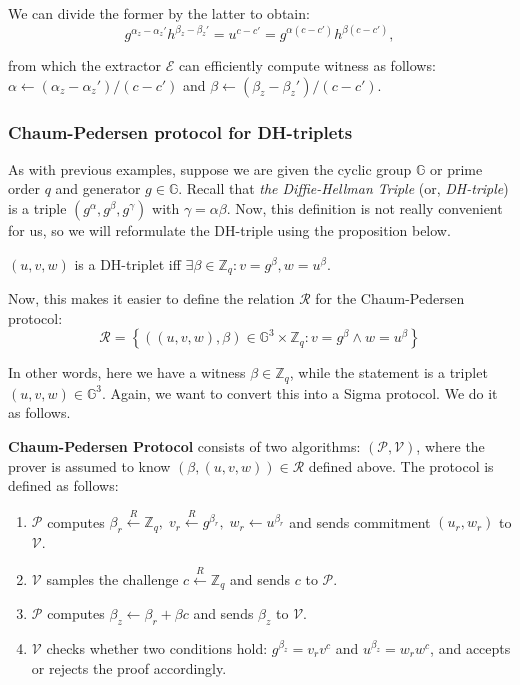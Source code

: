 \documentclass[../lecture-notes-148x210.tex]{subfiles}
\begin{document}
We can divide the former by the latter to obtain:
\begin{equation*}
    g^{\alpha_z - \alpha_z'}h^{\beta_z - \beta_z'} = u^{c-c'} = g^{\alpha(c-c')}h^{\beta(c-c')},
\end{equation*}

from which the extractor $\mathcal{E}$ can efficiently compute witness as follows: $\alpha \gets (\alpha_z - \alpha_z')\big/(c-c')$ and $\beta \gets (\beta_z - \beta_z')\big/(c-c')$.

\subsubsection{Chaum-Pedersen protocol for DH-triplets}

As with previous examples, suppose we are given the cyclic group $\mathbb{G}$ or prime order $q$ and generator $g \in \mathbb{G}$. Recall that \textit{the Diffie-Hellman Triple} (or, \textit{DH-triple}) is a triple $(g^{\alpha},g^{\beta},g^{\gamma})$ with $\gamma=\alpha\beta$. Now, this definition is not really convenient for us, so we will reformulate the DH-triple using the proposition below.

\begin{proposition}
    $(u,v,w)$ is a DH-triplet iff $\exists \beta \in \mathbb{Z}_q: v = g^{\beta}, w = u^{\beta}$.
\end{proposition}

Now, this makes it easier to define the relation $\mathcal{R}$ for the Chaum-Pedersen protocol:
\begin{equation*}
    \mathcal{R} = \left\{ ((u,v,w), \beta) \in \mathbb{G}^3 \times \mathbb{Z}_q: v = g^{\beta} \wedge w = u^{\beta} \right\}
\end{equation*}

In other words, here we have a witness $\beta \in \mathbb{Z}_q$, while the statement is a triplet $(u,v,w) \in \mathbb{G}^3$. Again, we want to convert this into a Sigma protocol. We do it as follows.

\begin{definition}
    \textbf{Chaum-Pedersen Protocol} consists of two algorithms: $(\mathcal{P}, \mathcal{V})$, where the prover is assumed to know $(\beta,(u,v,w)) \in \mathcal{R}$ defined above. The protocol is defined as follows:
    \begin{enumerate}
        \item $\mathcal{P}$ computes $\beta_r \xleftarrow{R} \mathbb{Z}_q, \; v_r \xleftarrow{R} g^{\beta_r}, \; w_r \gets u^{\beta_r}$ and sends commitment $(u_r,w_r)$ to $\mathcal{V}$.
        \item $\mathcal{V}$ samples the challenge $c \xleftarrow{R} \mathbb{Z}_q$ and sends $c$ to $\mathcal{P}$.
        \item $\mathcal{P}$ computes $\beta_z \gets \beta_r + \beta c$ and sends $\beta_z$ to $\mathcal{V}$.
        \item $\mathcal{V}$ checks whether two conditions hold: $g^{\beta_z} = v_rv^c$ and $u^{\beta_z} = w_r w^c$, and accepts or rejects the proof accordingly.
    \end{enumerate}
\end{definition}
\end{document}
